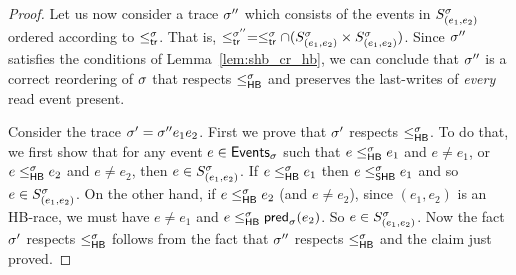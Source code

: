 \begin{proof}
Let us now consider a trace $\sigma''$ which consists of the events in
$S^\sigma_{(e_1,e_2)}$ ordered according to $\leq^{\sigma}_{\mathsf{tr}}$. That is, $\leq^{\sigma''}_{\mathsf{tr}}
= \leq^{\sigma}_{\mathsf{tr}} \cap (S^\sigma_{(e_1,e_2)} \times S^\sigma_{(e_1,e_2)})$. Since $\sigma''$ satisfies the
conditions of Lemma~\ref{lem:shb_cr_hb}, we can conclude that $\sigma''$
is a correct reordering of $\sigma$ that respects $\leq^{\sigma}_{\mathsf{HB}}$ and preserves the
last-writes of \emph{every} read event present.

Consider the trace $\sigma' = \sigma''e_1e_2$. First we prove that $\sigma'$
respects $\leq^{\sigma}_{\mathsf{HB}}$. To do that, we first show that for any event
$e\in \mathsf{Events}_{\sigma}$ such that $e \leq^{\sigma}_{\mathsf{HB}} e_1$ and $e \neq e_1$, or
$e \leq^{\sigma}_{\mathsf{HB}} e_2$ and $e \neq e_2$, then $e \in S^\sigma_{(e_1,e_2)}$.  If
$e \leq^{\sigma}_{\mathsf{HB}} e_1$ then $e \leq^{\sigma}_{\mathsf{SHB}} e_1$ and so $e \in S^\sigma_{(e_1,e_2)}$. On the
other hand, if $e \leq^{\sigma}_{\mathsf{HB}} e_2$ (and $e \neq e_2$), since $(e_1,e_2)$
is an HB-race, we must have $e \neq e_1$ and
$e \leq^{\sigma}_{\mathsf{HB}} \mathsf{pred}_{\sigma}(e_2)$. So $e \in S^\sigma_{(e_1,e_2)}$. Now the fact $\sigma'$
respects $\leq^{\sigma}_{\mathsf{HB}}$ follows from the fact that $\sigma''$ respects
$\leq^{\sigma}_{\mathsf{HB}}$ and the claim just proved.


\end{proof}
